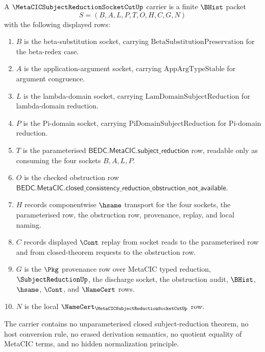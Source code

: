 \begin{definition}
\label{def:metacic-subject-reduction-socket-cut-carrier}
A $\MetaCICSubjectReductionSocketCutUp$ carrier is a finite $\BHist$ packet
$$
S=(B,A,L,P,T,O,H,C,G,N)
$$
with the following displayed rows:
\begin{enumerate}
\item $B$ is the beta-substitution socket, carrying $\mathrm{BetaSubstitutionPreservation}$ for the beta-redex case.
\item $A$ is the application-argument socket, carrying $\mathrm{AppArgTypeStable}$ for argument congruence.
\item $L$ is the lambda-domain socket, carrying $\mathrm{LamDomainSubjectReduction}$ for lambda-domain reduction.
\item $P$ is the Pi-domain socket, carrying $\mathrm{PiDomainSubjectReduction}$ for Pi-domain reduction.
\item $T$ is the parameterised $\mathsf{BEDC.MetaCIC.subject\_reduction}$ row, readable only as consuming the four sockets $B,A,L,P$.
\item $O$ is the checked obstruction row $\mathsf{BEDC.MetaCIC.closed\_consistency\_reduction\_obstruction\_not\_available}$.
\item $H$ records componentwise $\hsame$ transport for the four sockets, the parameterised row, the obstruction row, provenance, replay, and local naming.
\item $C$ records displayed $\Cont$ replay from socket reads to the parameterised row and from closed-theorem requests to the obstruction row.
\item $G$ is the $\Pkg$ provenance row over MetaCIC typed reduction, $\SubjectReductionUp$, the discharge socket, the obstruction audit, $\BHist$, $\hsame$, $\Cont$, and $\NameCert$ rows.
\item $N$ is the local $\NameCert_{\MetaCICSubjectReductionSocketCutUp}$ row.
\end{enumerate}
The carrier contains no unparameterised closed subject-reduction theorem, no host conversion rule, no erased derivation semantics, no quotient equality of MetaCIC terms, and no hidden normalization principle.
\end{definition}

